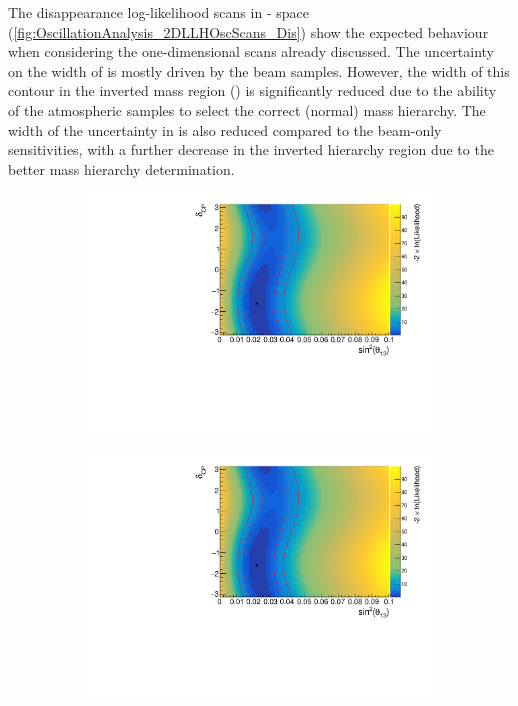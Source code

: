 The disappearance log-likelihood scans in - space (\autoref{fig:OscillationAnalysis_2DLLHOscScans_Dis}) show the expected behaviour when considering the one-dimensional scans already discussed. The uncertainty on the width of  is mostly driven by the beam samples. However, the width of this contour in the inverted mass region () is significantly reduced due to the ability of the atmospheric samples to select the correct (normal) mass hierarchy. The width of the uncertainty in  is also reduced compared to the beam-only sensitivities, with a further decrease in the inverted hierarchy region due to the better mass hierarchy determination.

\begin{figure}[h]
  \begin{subfigure}[t]{0.5\textwidth}
    \includegraphics[width=\textwidth, trim={0mm 0mm 0mm 0mm}, clip,page=1]{Figures/OA/AppearanceScans.pdf}
  \end{subfigure}%
  \begin{subfigure}[t]{0.5\textwidth}
    \includegraphics[width=\textwidth, trim={0mm 0mm 0mm 0mm}, clip,page=2]{Figures/OA/AppearanceScans.pdf}

\end{subfigure}
\end{figure}
